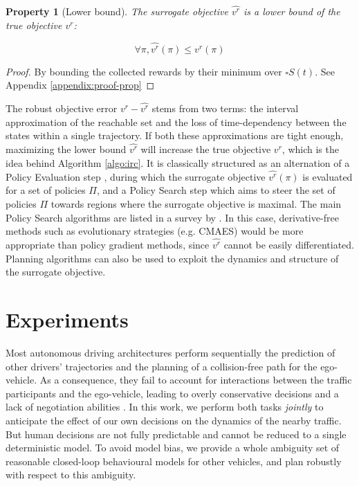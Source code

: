 \documentclass{article}
\newcommand{\interval}[1]{\square #1}
\newtheorem{property}{Property}
\begin{document}
\vspace{-2mm}
\begin{property}[Lower bound]
\label{prop:lower-bound}
The surrogate objective $\hat{v^r}$ is a lower bound of the true objective $v^r$:

\vspace{-5mm}
\begin{equation}
\forall \pi, \hat{v^r}(\pi) \leq v^r(\pi)
\end{equation}
\end{property}

\vspace{-5mm}
\begin{proof}
By bounding the collected rewards by their minimum over $\interval{S}(t)$. See Appendix \ref{appendix:proof-prop} 
\end{proof}


\vspace{-2mm}
The robust objective error $v^r - \hat{v^r}$ stems from two terms: the interval approximation of the reachable set and the loss of time-dependency between the states within a single trajectory. If both these approximations are tight enough, maximizing the lower bound $\hat{v^r}$ will increase the true objective $v^r$, which is the idea behind Algorithm \ref{algo:irc}. It is classically structured as an alternation of a Policy Evaluation step , during which the surrogate objective $\hat{v^r}(\pi)$ is evaluated for a set of policies $\Pi$, and a Policy Search step which aims to steer the set of policies $\Pi$ towards regions where the surrogate objective is maximal. The main Policy Search algorithms are listed in a survey by \citet{Deisenroth2011b}. In this case, derivative-free methods such as evolutionary strategies (e.g. CMAES)  would be more appropriate than policy gradient methods, since $\hat{v^r}$ cannot be easily differentiated. Planning algorithms can also be used to exploit the dynamics and structure of the surrogate objective.


\vspace{-3mm}
\section{Experiments}
\label{experiments}

\vspace{-3mm}
Most autonomous driving architectures perform sequentially the prediction of other drivers’ trajectories and the planning of a collision-free path for the ego-vehicle. As a consequence, they fail to account for interactions between the traffic participants and the ego-vehicle, leading to overly conservative decisions and a lack of negotiation abilities \citep{Trautman2010}.
In this work, we perform both tasks \emph{jointly} to anticipate the effect of our own decisions on the dynamics of the nearby traffic. But human decisions are not fully predictable and cannot be reduced to a single deterministic model. To avoid model bias, we provide a whole ambiguity set of reasonable closed-loop behavioural models for other vehicles, and plan robustly with respect to this ambiguity.
\end{document}
